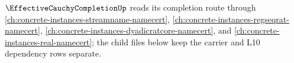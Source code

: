 $\EffectiveCauchyCompletionUp$ reads its completion route through \autoref{ch:concrete-instances-streamname-namecert}, \autoref{ch:concrete-instances-regseqrat-namecert}, \autoref{ch:concrete-instances-dyadicratcore-namecert}, and \autoref{ch:concrete-instances-real-namecert}; the child files below keep the carrier and L10 dependency rows separate.



